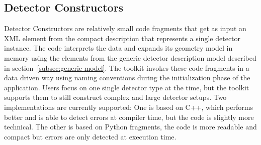 \documentclass[a4paper]{jpconf}
\begin{document}

\subsection{Detector Constructors}
\label{sec:detector-constructors}
\noindent
Detector Constructors are relatively small code fragments that get
as input an XML element from the compact description that represents 
a single detector instance. The code interprets the data and expands 
its geometry model in memory using the elements from the generic detector 
description model described in section~\ref{subsec:generic-model}.
The toolkit invokes these code fragments in a data driven way
using naming conventions during the initialization phase of the 
application. Users focus on one 
single detector type at the time, but the toolkit supports them to still
construct complex and large detector setups. 
Two implementations are currently supported: One is based on 
C++, which performs better and is able to detect errors at 
compiler time, but the code is slightly more technical.
The other is based on Python fragments, the code is more readable and
compact but errors are only detected at execution time.
\end{document}
